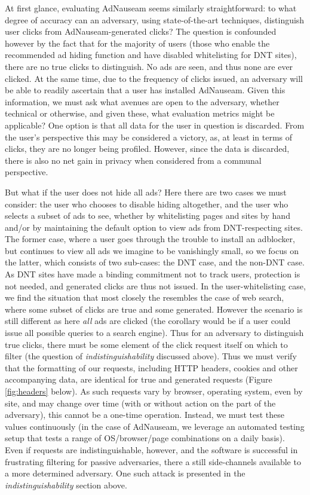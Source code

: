 \documentclass[conference]{IEEEtran}
\begin{document}
At first glance, evaluating AdNauseam seems similarly straightforward: to what degree of accuracy can an adversary, using state-of-the-art techniques, distinguish user clicks from AdNauseam-generated clicks? The question is confounded however by the fact that for the majority of users (those who enable the recommended ad hiding function and have disabled whitelisting for DNT sites), there are no true clicks to distinguish. No ads are seen, and thus none are ever clicked. At the same time, due to the frequency of clicks issued, an adversary will be able to readily ascertain that a user has installed AdNauseam. Given this information, we must ask what avenues are open to the adversary, whether technical or otherwise, and given these, what evaluation metrics might be applicable? One option is that all data for the user in question is discarded. From the user's perspective this may be considered a victory, as, at least in terms of clicks, they are no longer being profiled. However, since the data is discarded, there is also no net gain in privacy when considered from a communal perspective.

But what if the user does not hide all ads? Here there are two cases we must consider: the user who chooses to disable hiding altogether, and the user who selects a subset of ads to see, whether by whitelisting pages and sites by hand and/or by maintaining the default option to view ads from DNT-respecting sites. The former case, where a user goes through the trouble to install an adblocker, but continues to view all ads we imagine to be vanishingly small, so we focus on the latter, which consists of two sub-cases: the DNT case, and the non-DNT case. As DNT sites have made a binding commitment not to track users, protection is not needed, and generated clicks are thus not issued. In the user-whitelisting case, we find the situation that most closely the resembles the case of web search, where some subset of clicks are true and some generated. However the scenario is still different as here \emph{all} ads are clicked (the corollary would be if a user could issue all possible queries to a search engine). Thus for an adversary to distinguish true clicks, there must be some element of the click request itself on which to filter (the question of \emph{indistinguishability} discussed above). Thus we must verify that the formatting of our requests, including HTTP headers, cookies and other accompanying data, are identical for true and generated requests (Figure \ref{fig:headers} below). As such requests vary by browser, operating system, even by site, and may change over time (with or without action on the part of the adversary), this cannot be a one-time operation. Instead, we must test these values continuously (in the case of AdNauseam, we leverage an automated testing setup that tests a range of OS/browser/page combinations on a daily basis). Even if requests are indistinguishable, however, and the software is successful in frustrating filtering for passive adversaries, there a still side-channels available to a more determined adversary. One such attack is presented in the \emph{indistinguishability} section above.
\end{document}
